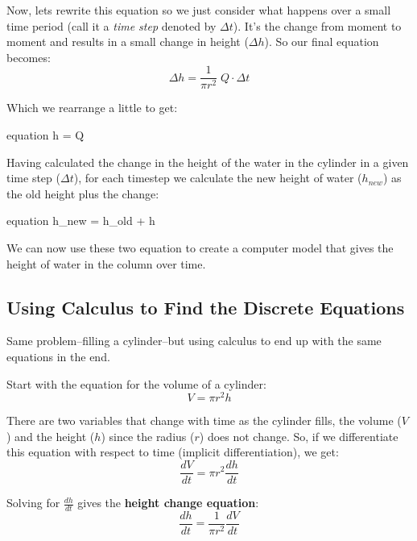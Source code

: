 \documentclass[11pt,fleqn]{book}
\begin{document}
	Now, lets rewrite this equation so we just consider what happens over a small time period (call it a \textit{time step} denoted by $\Delta t$). It's the change from moment to moment and results in a small change in height ($\Delta h$). So our final equation becomes:
		\begin{equation}
			\Delta h = \frac{1}{\pi r^2} \; Q \cdot \Delta t
		\end{equation}
	
	Which we rearrange a little to get:
		\begin{empheq}[box=\fbox]{equation}
			\label{dh_eqn}
			\Delta h = \frac{\Delta t}{\pi r^2} \; Q 
		\end{empheq}
	
	Having calculated the change in the height of the water in the cylinder in a given time step ($\Delta t$), for each timestep we calculate the new height of water ($h_{new}$) as the old height plus the change:
		\begin{empheq}[box=\fbox]{equation}
			\label{hnew_eqn}
			h_{new} = h_{old} + \Delta h
		\end{empheq}
	
	We can now use these two equation to create a computer model that gives the height of water in the column over time.
	

\subsection{Using Calculus to Find the Discrete Equations} \label{CodeCalc}

	Same problem--filling a cylinder--but using calculus to end up with the same equations in the end.
	
	Start with the equation for the volume of a cylinder:
		\begin{equation}
			V = \pi r^2 h
		\end{equation}
	
	There are two variables that change with time as the cylinder fills, the volume ($V$) and the height ($h$) since the radius ($r$) does not change. So, if we differentiate this equation with respect to time (implicit differentiation), we get:
		\begin{equation}
			\frac{dV}{dt} = \pi r^2 \frac{dh}{dt} 
		\end{equation}
	
	Solving for $\frac{dh}{dt}$ gives the \textbf{height change equation}:
		\begin{equation}
			\label{eqn:heightChange}
			\frac{dh}{dt} = \frac{1 }{\pi r^2 } \frac{dV}{dt}
		\end{equation}
\end{document}
